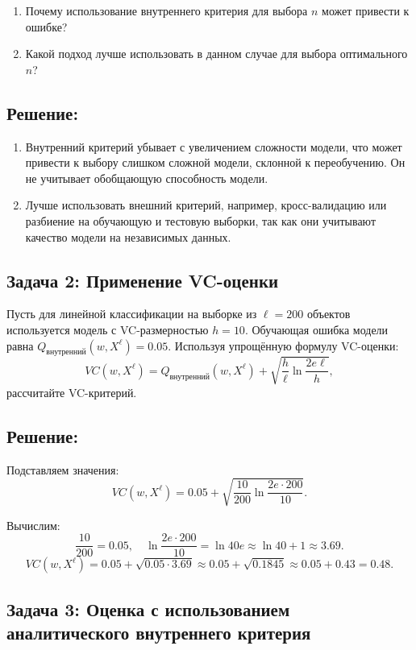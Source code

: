 \begin{enumerate}
    \item Почему использование внутреннего критерия для выбора $n$ может привести к ошибке?
    \item Какой подход лучше использовать в данном случае для выбора оптимального $n$?
\end{enumerate}

\subsection*{Решение:}

\begin{enumerate}
    \item Внутренний критерий убывает с увеличением сложности модели, что может привести к выбору слишком сложной модели, склонной к переобучению. Он не учитывает обобщающую способность модели.
    \item Лучше использовать внешний критерий, например, кросс-валидацию или разбиение на обучающую и тестовую выборки, так как они учитывают качество модели на независимых данных.
\end{enumerate}


\subsection*{Задача 2: Применение VC-оценки}

Пусть для линейной классификации на выборке из $\ell = 200$ объектов используется модель с VC-размерностью $h = 10$. Обучающая ошибка модели равна $Q_{\text{внутренний}}(w, X^\ell) = 0.05$. Используя упрощённую формулу VC-оценки:
\[
VC(w, X^\ell) = Q_{\text{внутренний}}(w, X^\ell) + \sqrt{\frac{h}{\ell} \ln \frac{2e\ell}{h}},
\]
рассчитайте VC-критерий.

\subsection*{Решение:}

Подставляем значения:
\[
VC(w, X^\ell) = 0.05 + \sqrt{\frac{10}{200} \ln \frac{2e \cdot 200}{10}}.
\]

Вычислим:
\[
\frac{10}{200} = 0.05, \quad \ln \frac{2e \cdot 200}{10} = \ln 40e \approx \ln 40 + 1 \approx 3.69.
\]
\[
VC(w, X^\ell) = 0.05 + \sqrt{0.05 \cdot 3.69} \approx 0.05 + \sqrt{0.1845} \approx 0.05 + 0.43 = 0.48.
\]


\subsection*{Задача 3: Оценка с использованием аналитического внутреннего критерия}

